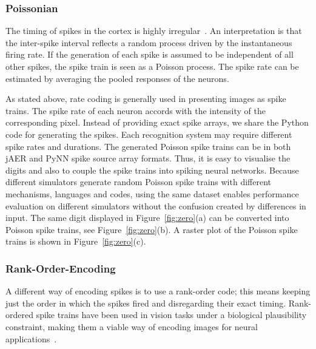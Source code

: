 \documentclass{frontiersENG} %
\begin{document}
\subsubsection{Poissonian}
\label{sec:poissonian}
The timing of spikes in the cortex is highly irregular~\citep{squire1998findings}.
An interpretation is that the inter-spike interval reflects a random process driven by the instantaneous firing rate.
If the generation of each spike is assumed to be independent of all other spikes, the spike train is seen as a Poisson process.
The spike rate can be estimated by averaging the pooled responses of the neurons.

As stated above, rate coding is generally used in presenting images as spike trains.
The spike rate of each neuron accords with the intensity of the corresponding pixel.
Instead of providing exact spike arrays, we share the Python code for generating the spikes.
Each recognition system may require different spike rates and durations.
The generated Poisson spike trains can be in both jAER and PyNN spike source array formats.
Thus, it is easy to visualise the digits and also to couple the spike trains into spiking neural networks.
Because different simulators generate random Poisson spike trains with different mechanisms, languages and codes, using the same dataset enables performance evaluation on different simulators without the confusion created by differences in input.
The same digit displayed in Figure~\ref{fig:zero}(a) can be converted into Poisson spike trains, see Figure~\ref{fig:zero}(b).
A raster plot of the Poisson spike trains is shown in Figure~\ref{fig:zero}(c).



\subsubsection{Rank-Order-Encoding}
A different way of encoding spikes is to use a rank-order code; this means
keeping just the order in which the spikes fired and disregarding their exact timing. Rank-ordered spike trains have been used in vision tasks under a biological plausibility constraint, making them a viable way of encoding images for neural applications~\citep{van2001rate,sen2009evaluating,masmoudi2010novel}.
\end{document}
